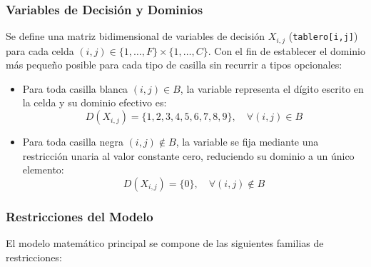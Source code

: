 \subsubsection{Variables de Decisión y Dominios}
Se define una matriz bidimensional de variables de decisión $X_{i,j}$ (\texttt{tablero[i,j]}) para cada celda $(i, j) \in \{1, \dots, F\} \times \{1, \dots, C\}$. Con el fin de establecer el dominio más pequeño posible para cada tipo de casilla sin recurrir a tipos opcionales:
\begin{itemize}
    \item Para toda casilla blanca $(i, j) \in B$, la variable representa el dígito escrito en la celda y su dominio efectivo es:
    \[
        D(X_{i,j}) = \{1, 2, 3, 4, 5, 6, 7, 8, 9\}, \quad \forall (i, j) \in B
    \]
    \item Para toda casilla negra $(i, j) \notin B$, la variable se fija mediante una restricción unaria al valor constante cero, reduciendo su dominio a un único elemento:
    \[
        D(X_{i,j}) = \{0\}, \quad \forall (i, j) \notin B
    \]
\end{itemize}

\subsubsection{Restricciones del Modelo}
El modelo matemático principal se compone de las siguientes familias de restricciones:

